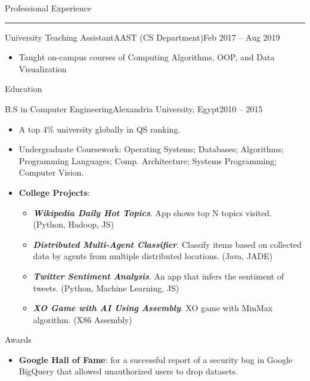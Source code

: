 \documentclass[]{ahmedamrcv}
\begin{document}
\begin{cvsection}{Professional Experience}
            \centering\rule{300pt}{0.4pt}

            \begin{cvsubsection}{University Teaching Assistant}{AAST (CS Department)}{Feb 2017 -- Aug 2019}
			\begin{itemize}
				\item Taught on-campus courses of Computing Algorithms, OOP, and Data Visualization
			\end{itemize}
		\end{cvsubsection}
	\end{cvsection}
 
	\begin{cvsection}{Education}
		\begin{cvsubsection}{B.S in Computer Engineering}{Alexandria University, Egypt}{2010 -- 2015}
			\begin{itemize}
                    \item A top 4\% university globally in QS ranking.
				\item Undergraduate Coursework: Operating Systems; Databases; Algorithms; Programming Languages; Comp. Architecture; Systems Programming; Computer Vision.
                    \item \textbf{College Projects}:
                        \begin{itemize}
            			\item \textbf{\textit{Wikipedia Daily Hot Topics}}. App shows top N topics visited. (Python, Hadoop, JS)
        				\item \textbf{\textit{Distributed Multi-Agent Classifier}}. Classify items based on collected data by agents from multiple distributed locations. (Java, JADE)
        				\item \textbf{\textit{Twitter Sentiment Analysis}}. An app that infers the sentiment of tweets. (Python, Machine Learning, JS)
        				\item \textbf{\textit{XO Game with AI Using Assembly}}. XO game with MinMax algorithm. (X86 Assembly)
    			     \end{itemize}
                \end{itemize}
		\end{cvsubsection}
        \begin{cvsection}{Awards}
            \begin{cvsubsection}{}{}{}
            \begin{itemize}
                \item \textbf{Google Hall of Fame}: for a successful report of a security bug in Google BigQuery that allowed unauthorized users to drop datasets.
            \end{itemize}
            \end{cvsubsection}
            \end{cvsection}
	\end{cvsection}
       
\end{document}
